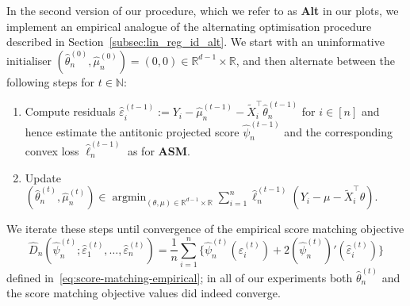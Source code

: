 \documentclass[a4paper]{article}
\newcommand{\R}{\mathbb{R}}
\DeclareMathOperator*{\argmin}{argmin}
\theoremstyle{definition}
\begin{document}
In the second version of our procedure, which we refer to as \textbf{Alt} in our plots, we implement an empirical analogue of the alternating optimisation procedure described in Section~\ref{subsec:lin_reg_id_alt}. We start with an uninformative initialiser $(\hat{\theta}_n^{(0)}, \hat{\mu}_n^{(0)}) = (0, 0) \in \R^{d-1} \times \R$, and then alternate between the following steps for $t \in \mathbb{N}$:
\begin{enumerate}[label=\Roman*.]
\item Compute residuals $\hat{\varepsilon}_i^{(t-1)} := Y_i - \hat{\mu}_n^{(t-1)} - \tilde{X}_i^\top \hat{\theta}_n^{(t-1)}$ for $i \in [n]$ and hence estimate the antitonic projected score $\hat{\psi}_n^{(t-1)}$ and the corresponding convex loss $\hat{\ell}_n^{(t-1)}$ as for \textbf{ASM}.
\item Update $(\hat{\theta}_n^{(t)}, \hat{\mu}_n^{(t)}) \in \argmin_{(\theta, \mu) \in \mathbb{R}^{d-1} \times \mathbb{R}} \sum_{i=1}^n \hat{\ell}_n^{(t-1)}(Y_i - \mu - \tilde{X}_i^\top \theta)$.
\end{enumerate}
We iterate these steps until convergence of the empirical score matching objective
\[
\hat{D}_n(\hat{\psi}_n^{(t)}; \hat{\varepsilon}_1^{(t)},\dotsc,\hat{\varepsilon}_n^{(t)}) = \frac{1}{n}\sum_{i=1}^n \bigl\{ \hat{\psi}_n^{(t)}(\hat{\varepsilon}_i^{(t)}) + 2(\hat{\psi}_n^{(t)})'(\hat{\varepsilon}_i^{(t)}) \bigr\}
\]
defined in~\eqref{eq:score-matching-empirical}; in all of our experiments both $\hat{\theta}_n^{(t)}$ and the score matching objective values did indeed converge.  
\end{document}
